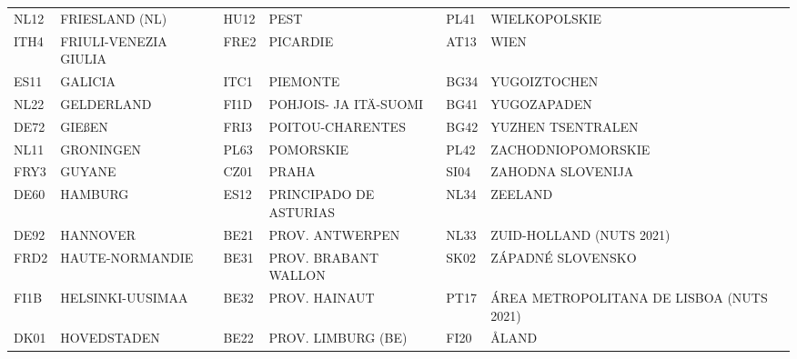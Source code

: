 \documentclass[a4paper,11pt,oneside]{article}
\begin{document}
\begin{table}
{\begin{tabular}{llllll}
NL12                & FRIESLAND (NL)              & HU12                & PEST                       & PL41                & WIELKOPOLSKIE                                               \\
ITH4                & FRIULI-VENEZIA GIULIA       & FRE2                & PICARDIE                   & AT13                & WIEN                                                        \\
ES11                & GALICIA                     & ITC1                & PIEMONTE                   & BG34                & YUGOIZTOCHEN                                                \\
NL22                & GELDERLAND                  & FI1D                & POHJOIS- JA ITÄ-SUOMI      & BG41                & YUGOZAPADEN                                                 \\
DE72                & GIEßEN                      & FRI3                & POITOU-CHARENTES           & BG42                & YUZHEN TSENTRALEN                                           \\
NL11                & GRONINGEN                   & PL63                & POMORSKIE                  & PL42                & ZACHODNIOPOMORSKIE                                          \\
FRY3                & GUYANE                      & CZ01                & PRAHA                      & SI04                & ZAHODNA SLOVENIJA                                           \\
DE60                & HAMBURG                     & ES12                & PRINCIPADO DE ASTURIAS     & NL34                & ZEELAND                                                     \\
DE92                & HANNOVER                    & BE21                & PROV. ANTWERPEN            & NL33                & ZUID-HOLLAND (NUTS 2021)                                    \\
FRD2                & HAUTE-NORMANDIE             & BE31                & PROV. BRABANT WALLON       & SK02                & ZÁPADNÉ SLOVENSKO                                           \\
FI1B                & HELSINKI-UUSIMAA            & BE32                & PROV. HAINAUT              & PT17                & ÁREA METROPOLITANA DE LISBOA (NUTS 2021)                    \\
DK01                & HOVEDSTADEN                 & BE22                & PROV. LIMBURG (BE)         & FI20                & ÅLAND                                                       \\

\end{tabular}}
\end{table}
\end{document}
